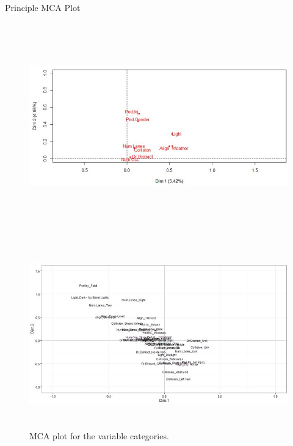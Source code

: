 \documentclass[final]{beamer}
\newlength{\onecolwid}
\newlength{\twocolwid}
\begin{document}
\begin{frame}[t]
\begin{columns}[t]
\begin{column}{\twocolwid}
\begin{columns}[t,totalwidth=\twocolwid]
\begin{column}{\onecolwid}
\begin{block}{Principle MCA Plot}
            \begin{figure}
              \begin{center}
                \includegraphics[width=10in, height=3.5in]{m1.jpg}
              \end{center}
            \end{figure}
              \begin{figure}
              \begin{center}
                \includegraphics[width=10in, height=3.2in]{m2.jpg}
                \caption{MCA plot for the variable categories.}
                \label{fig:multDom}
              \end{center}
            \end{figure}
        \end{block}
      \end{column}

\end{columns}
\end{column}
\end{columns}
\end{frame}
\end{document}
